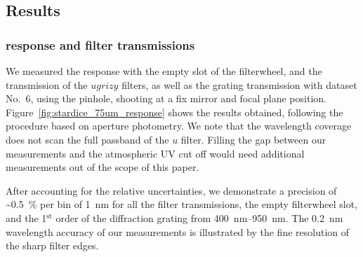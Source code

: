 %
%
%
%

\subsection{Results}
\subsubsection{\SD response and filter transmissions}

We measured the \SD response with the empty slot of the filterwheel, and the transmission of the $ugrizy$ filters, as well as the grating transmission with dataset No.~6, using the \spinhole pinhole, shooting at a fix mirror and focal plane position. Figure~\ref{fig:stardice_75um_response} shows the results obtained, following the procedure based on aperture photometry. We note that the wavelength coverage does not scan the full passband of the $u$ filter. Filling the gap between our measurements and the atmospheric UV cut off would need additional measurements out of the scope of this paper.

After accounting for the relative uncertainties, we demonstrate a precision of \textasciitilde\SI{0.5}{\%} per bin of \SI{1}{nm} for all the filter transmissions, the empty filterwheel slot, and the 1$^\mathrm{st}$ order of the diffraction grating from \SIrange{400}{950}{\nano\meter}. The \SI{0.2}{nm} wavelength accuracy of our measurements is illustrated by the fine resolution of the sharp filter edges.



